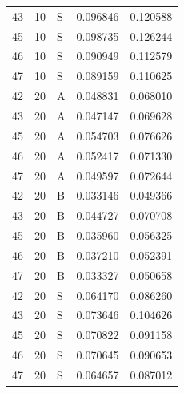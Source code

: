 \begin{longtable}{rrlrr}
43 & 10 & S & 0.096846 & 0.120588\\
45 & 10 & S & 0.098735 & 0.126244\\
46 & 10 & S & 0.090949 & 0.112579\\
47 & 10 & S & 0.089159 & 0.110625\\
42 & 20 & A & 0.048831 & 0.068010\\
43 & 20 & A & 0.047147 & 0.069628\\
45 & 20 & A & 0.054703 & 0.076626\\
46 & 20 & A & 0.052417 & 0.071330\\
47 & 20 & A & 0.049597 & 0.072644\\
42 & 20 & B & 0.033146 & 0.049366\\
43 & 20 & B & 0.044727 & 0.070708\\
45 & 20 & B & 0.035960 & 0.056325\\
46 & 20 & B & 0.037210 & 0.052391\\
47 & 20 & B & 0.033327 & 0.050658\\
42 & 20 & S & 0.064170 & 0.086260\\
43 & 20 & S & 0.073646 & 0.104626\\
45 & 20 & S & 0.070822 & 0.091158\\
46 & 20 & S & 0.070645 & 0.090653\\
47 & 20 & S & 0.064657 & 0.087012\\
\end{longtable}
\endgroup


